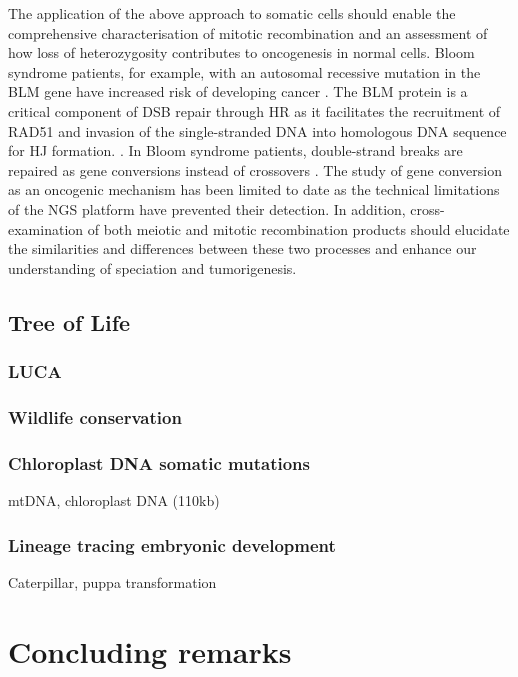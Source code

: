 The application of the above approach to somatic cells should enable the comprehensive characterisation of mitotic recombination and an assessment of how loss of heterozygosity contributes to oncogenesis in normal cells. Bloom syndrome patients, for example, with an autosomal recessive mutation in the BLM gene have increased risk of developing cancer \cite{}. The BLM protein is a critical component of DSB repair through HR as it facilitates the recruitment of RAD51 and invasion of the single-stranded DNA into homologous DNA sequence for HJ formation. \cite{}. In Bloom syndrome patients, double-strand breaks are repaired as gene conversions instead of crossovers \cite{}. The study of gene conversion as an oncogenic mechanism has been limited to date as the technical limitations of the NGS platform have prevented their detection. In addition, cross-examination of both meiotic and mitotic recombination products should elucidate the similarities and differences between these two processes and enhance our understanding of speciation and tumorigenesis. 


\subsection{Tree of Life}
 
\subsubsection{LUCA}
 
\subsubsection{Wildlife conservation}

\subsubsection{Chloroplast DNA somatic mutations}
mtDNA, chloroplast DNA (110kb) 

\subsubsection{Lineage tracing embryonic development}
Caterpillar, puppa transformation 


\section{Concluding remarks}
 
